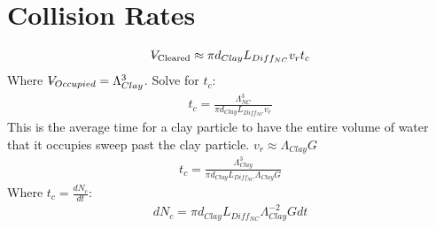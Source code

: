 \documentclass[letterpaper,10pt,english]{sphinxmanual}
\begin{document}
\section{Collision Rates}
\label{\detokenize{Rapid_Mix/RM_Theory_and_Future_Work:collision-rates}}\label{\detokenize{Rapid_Mix/RM_Theory_and_Future_Work:heading-collision-rates}}\begin{equation}\label{equation:Rapid_Mix/RM_Theory_and_Future_Work:Rapid_Mix/RM_Theory_and_Future_Work:8}
\begin{split}{\rlap{\kern.08em--}V_{\rm{Cleared}}} \approx \pi d_{Clay} L_{Diff_{NC}} v_r t_c\end{split}
\end{equation}
Where \(\rlap{\kern.08em--}V_{Occupied} = \Lambda_{Clay}^3\). Solve for \(t_c\):
\begin{equation}\label{equation:Rapid_Mix/RM_Theory_and_Future_Work:Rapid_Mix/RM_Theory_and_Future_Work:9}
\begin{split}t_c = \frac{\Lambda_{NC}^3}{\pi d_{Clay} L_{Diff_{NC}} v_r}\end{split}
\end{equation}
This is the average time for a clay particle to have the entire volume of water that it occupies sweep past the clay particle.
\(v_r \approx \Lambda_{Clay} G\)
\begin{equation}\label{equation:Rapid_Mix/RM_Theory_and_Future_Work:Rapid_Mix/RM_Theory_and_Future_Work:10}
\begin{split}t_c = \frac{\Lambda_{Clay}^3}{\pi d_{Clay} L_{Diff_{NC}} \Lambda_{Clay} G}\end{split}
\end{equation}
Where \(t_c = \frac{dN_c}{dt}\):
\begin{equation}\label{equation:Rapid_Mix/RM_Theory_and_Future_Work:Rapid_Mix/RM_Theory_and_Future_Work:11}
\begin{split}dN_c = \pi d_{Clay} L_{Diff_{NC}}{\Lambda^{-2}_{Clay}} G dt\end{split}
\end{equation}
\end{document}
